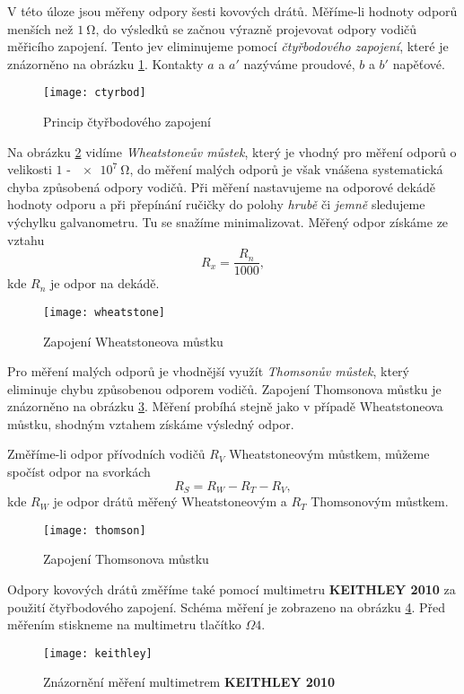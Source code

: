 \documentclass[0-protokol.tex]{subfiles}
\begin{document}
V této úloze jsou měřeny odpory šesti kovových drátů. Měříme-li hodnoty odporů menších než $\SI{1}{\ohm}$, do výsledků se začnou výrazně projevovat odpory vodičů měřicího zapojení. Tento jev eliminujeme pomocí \textit{čtyřbodového zapojení}, které je znázorněno na obrázku \ref{fig:ctyrbod}. Kontakty $a$ a $a'$ nazýváme proudové, $b$ a $b'$ napěťové.
\begin{figure}[H]
\centering
\texttt{[image: ctyrbod]}
\caption{Princip čtyřbodového zapojení \cite{stud_text}}
\label{fig:ctyrbod}
\end{figure}

Na obrázku \ref{fig:wheatstone} vidíme \textit{Wheatstoneův můstek}, který je vhodný pro měření odporů o velikosti $1$ - $\SI{e7}{\ohm}$, do měření malých odporů je však vnášena systematická chyba způsobená odpory vodičů. Při měření nastavujeme na odporové dekádě hodnoty odporu a při přepínání ručičky do polohy \textit{hrubě} či \textit{jemně} sledujeme výchylku galvanometru. Tu se snažíme minimalizovat. Měřený odpor získáme ze vztahu 
\begin{equation} \label{eq:wheatstone}
R_x = \frac{R_n}{1000},
\end{equation}
kde $R_n$ je odpor na dekádě. 
\begin{figure}[H]
\centering
\texttt{[image: wheatstone]}
\caption{Zapojení Wheatstoneova můstku \cite{stud_text}}
\label{fig:wheatstone}
\end{figure}

Pro měření malých odporů je vhodnější využít \textit{Thomsonův můstek}, který eliminuje chybu způsobenou odporem vodičů. Zapojení Thomsonova můstku je znázorněno na obrázku \ref{fig:thomson}. Měření probíhá stejně jako v případě Wheatstoneova můstku, shodným vztahem získáme výsledný odpor.

Změříme-li odpor přívodních vodičů $R_V$ Wheatstoneovým můstkem, můžeme spočíst odpor na svorkách 
\begin{equation} \label{eq:svorky}
R_S = R_W - R_T - R_V,
\end{equation}
kde $R_W$ je odpor drátů měřený Wheatstoneovým a $R_T$ Thomsonovým můstkem.
\begin{figure}[H]
\centering
\texttt{[image: thomson]}
\caption{Zapojení Thomsonova můstku \cite{stud_text}}
\label{fig:thomson}
\end{figure}

Odpory kovových drátů změříme také pomocí multimetru \textbf{KEITHLEY 2010} za použití čtyřbodového zapojení. Schéma měření je zobrazeno na obrázku \ref{fig:keithley}. Před měřením stiskneme na multimetru tlačítko $\Omega 4$.
\begin{figure}[H]
\centering
\texttt{[image: keithley]}
\caption{Znázornění měření multimetrem \textbf{KEITHLEY 2010} \cite{stud_text}}
\label{fig:keithley}
\end{figure}
\end{document}
